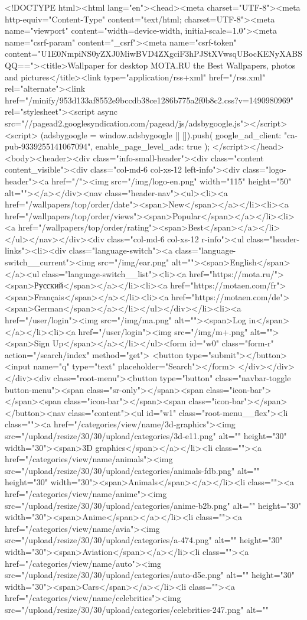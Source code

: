 <!DOCTYPE html><html lang="en"><head><meta charset="UTF-8"><meta http-equiv="Content-Type" content="text/html; charset=UTF-8"><meta name="viewport" content="width=device-width, initial-scale=1.0"><meta name="csrf-param" content="_csrf"><meta name="csrf-token" content="U1E0NmpiNS0yZXJ0MiwBVD4ZXgciF3hPJStXVwsqUBocKENyXABSQQ=="><title>Wallpaper for desktop MOTA.RU the Best Wallpapers, photos and pictures</title><link type="application/rss+xml" href="/rss.xml" rel="alternate"><link href="/minify/953d133af8552e9bccdb38ce1286b775a2f0b8c2.css?v=1490980969" rel="stylesheet"><script async src="//pagead2.googlesyndication.com/pagead/js/adsbygoogle.js"></script><script>
(adsbygoogle = window.adsbygoogle || []).push({
google_ad_client: "ca-pub-9339255141067094",
enable_page_level_ads: true
});
</script></head><body><header><div class="info-small-header"><div class="content content_visible"><div class="col-md-6 col-xs-12 left-info"><div class="logo-header"><a href="/"><img src="/img/logo-en.png" width="115" height="50" alt=""></a></div><nav class="header-nav"><ul><li><a href="/wallpapers/top/order/date"><span>New</span></a></li><li><a href="/wallpapers/top/order/views"><span>Popular</span></a></li><li><a href="/wallpapers/top/order/rating"><span>Best</span></a></li></ul></nav></div><div class="col-md-6 col-xs-12 r-info"><ul class="header-links"><li><div class="language-switch"><a class="language-switch__current"><img src="/img/ear.png" alt=""><span>English</span></a><ul class="language-switch__list"><li><a href="https://mota.ru/"><span>Русский</span></a></li><li><a href="https://motaen.com/fr"><span>Français</span></a></li><li><a href="https://motaen.com/de"><span>German</span></a></li></ul></div></li><li><a href="/user/login"><img src="/img/ma.png" alt=""><span>Log in</span></a></li><li><a href="/user/login"><img src="/img/m+.png" alt=""><span>Sign Up</span></a></li></ul><form id="w0" class="form-r" action="/search/index" method="get"> <button type="submit"></button><input name="q" type="text" placeholder="Search"></form> </div></div></div><div class="root-menu"><button type="button" class="navbar-toggle button-menu"><span class="sr-only"></span><span class="icon-bar"></span><span class="icon-bar"></span><span class="icon-bar"></span></button><nav class="content"><ul id="w1" class="root-menu__flex"><li class=""><a href="/categories/view/name/3d-graphics"><img src="/upload/resize/30/30/upload/categories/3d-e11.png" alt="" height="30" width="30"><span>3D graphics</span></a></li><li class=""><a href="/categories/view/name/animals"><img src="/upload/resize/30/30/upload/categories/animals-fdb.png" alt="" height="30" width="30"><span>Animals</span></a></li><li class=""><a href="/categories/view/name/anime"><img src="/upload/resize/30/30/upload/categories/anime-b2b.png" alt="" height="30" width="30"><span>Anime</span></a></li><li class=""><a href="/categories/view/name/avia"><img src="/upload/resize/30/30/upload/categories/a-474.png" alt="" height="30" width="30"><span>Aviation</span></a></li><li class=""><a href="/categories/view/name/auto"><img src="/upload/resize/30/30/upload/categories/auto-d5e.png" alt="" height="30" width="30"><span>Cars</span></a></li><li class=""><a href="/categories/view/name/celebrities"><img src="/upload/resize/30/30/upload/categories/celebrities-247.png" alt="" 